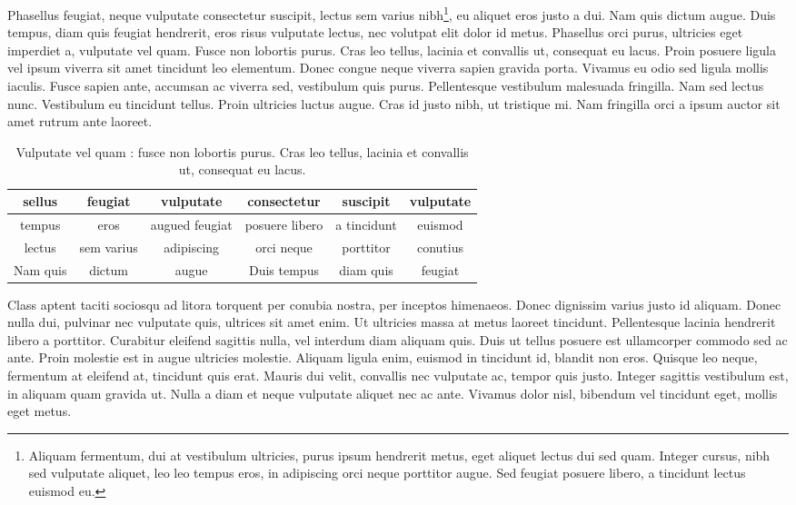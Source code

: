 \documentclass{EPUProjetDi}
\begin{document}
Phasellus feugiat, neque vulputate consectetur suscipit, lectus sem varius nibh\footnote{Aliquam fermentum, dui at vestibulum ultricies, purus ipsum hendrerit metus, eget aliquet lectus dui sed quam. Integer cursus, nibh sed vulputate aliquet, leo leo tempus eros, in adipiscing orci neque porttitor augue. Sed feugiat posuere libero, a tincidunt lectus euismod eu.}, eu aliquet eros justo a dui. Nam quis dictum augue. Duis tempus, diam quis feugiat hendrerit, eros risus vulputate lectus, nec volutpat elit dolor id metus. Phasellus orci purus, ultricies eget imperdiet a, vulputate vel quam. Fusce non lobortis purus. Cras leo tellus, lacinia et convallis ut, consequat eu lacus. Proin posuere ligula vel ipsum viverra sit amet tincidunt leo elementum. Donec congue neque viverra sapien gravida porta. Vivamus eu odio sed ligula mollis iaculis. Fusce sapien ante, accumsan ac viverra sed, vestibulum quis purus. Pellentesque vestibulum malesuada fringilla. Nam sed lectus nunc. Vestibulum eu tincidunt tellus. Proin ultricies luctus augue. Cras id justo nibh, ut tristique mi. Nam fringilla orci a ipsum auctor sit amet rutrum ante laoreet.

\begin{table}
\begin{center}
\begin{tabular}{cccccc}\hline
sellus & feugiat  & vulputate & consectetur & suscipit  & vulputate\\\hline\hline
tempus& eros & augued feugiat&  posuere libero& a tincidunt  & euismod \\
lectus & sem varius & adipiscing &orci neque & porttitor & conutius\\
Nam quis &  dictum & augue & Duis tempus & diam quis & feugiat \\\hline
\end{tabular}
\caption{Vulputate vel quam : fusce non lobortis purus. Cras leo tellus, lacinia et convallis ut, consequat eu lacus.}
\label{tab:vulputate_vel_quam}
\end{center}
\end{table}

Class aptent taciti sociosqu ad litora torquent per conubia nostra, per inceptos himenaeos. Donec dignissim varius justo id aliquam. Donec nulla dui, pulvinar nec vulputate quis, ultrices sit amet enim. Ut ultricies massa at metus laoreet tincidunt. Pellentesque lacinia hendrerit libero a porttitor. Curabitur eleifend sagittis nulla, vel interdum diam aliquam quis. Duis ut tellus posuere est ullamcorper commodo sed ac ante. Proin molestie est in augue ultricies molestie. Aliquam ligula enim, euismod in tincidunt id, blandit non eros. Quisque leo neque, fermentum at eleifend at, tincidunt quis erat. Mauris dui velit, convallis nec vulputate ac, tempor quis justo. Integer sagittis vestibulum est, in aliquam quam gravida ut. Nulla a diam et neque vulputate aliquet nec ac ante. Vivamus dolor nisl, bibendum vel tincidunt eget, mollis eget metus.
\end{document}
